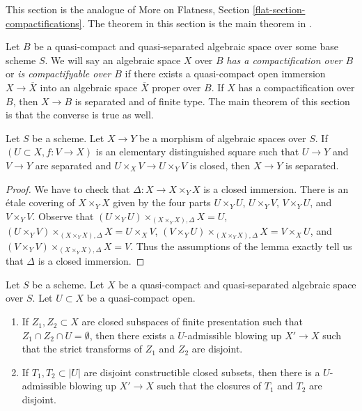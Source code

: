 \noindent
This section is the analogue of More on Flatness, Section
\ref{flat-section-compactifications}. The theorem in this
section is the main theorem in \cite{CLO}.

\medskip\noindent
Let $B$ be a quasi-compact and quasi-separated algebraic space over
some base scheme $S$. We will say an algebraic space $X$ over $B$
{\it has a compactification over $B$} or {\it is compactifyable over $B$}
if there exists a quasi-compact open immersion $X \to \overline{X}$
into an algebraic space $\overline{X}$ proper over $B$. If $X$
has a compactification over $B$, then $X \to B$ is separated and
of finite type. The main theorem of this section is that the converse
is true as well.

\begin{lemma}
\label{lemma-check-separated}
Let $S$ be a scheme. Let $X \to Y$ be a morphism of algebraic spaces over $S$.
If $(U \subset X, f : V \to X)$ is an elementary distinguished square
such that $U \to Y$ and $V \to Y$ are separated and
$U \times_X V \to U \times_Y V$ is closed, then $X \to Y$ is separated.
\end{lemma}

\begin{proof}
We have to check that $\Delta : X \to X \times_Y X$ is a closed immersion.
There is an \'etale covering of $X \times_Y X$ given by the four parts
$U \times_Y U$, $U \times_Y V$, $V \times_Y U$, and $V \times_Y V$.
Observe that
$(U \times_Y U) \times_{(X \times_Y X), \Delta} X  = U$,
$(U \times_Y V) \times_{(X \times_Y X), \Delta} X = U \times_X V$,
$(V \times_Y U) \times_{(X \times_Y X), \Delta} X = V \times_X U$, and
$(V \times_Y V) \times_{(X \times_Y X), \Delta} X = V$.
Thus the assumptions of the lemma
exactly tell us that $\Delta$ is a closed immersion.
\end{proof}

\begin{lemma}
\label{lemma-separate-disjoint-locally-closed-by-blowing-up}
Let $S$ be a scheme.
Let $X$ be a quasi-compact and quasi-separated algebraic space over $S$.
Let $U \subset X$ be a quasi-compact open.
\begin{enumerate}
\item If $Z_1, Z_2 \subset X$ are closed subspaces of finite
presentation such that $Z_1 \cap Z_2 \cap U = \emptyset$, then
there exists a $U$-admissible blowing up $X' \to X$
such that the strict transforms of $Z_1$ and $Z_2$ are disjoint.
\item If $T_1, T_2 \subset |U|$ are disjoint constructible closed
subsets, then there is a $U$-admissible blowing up $X' \to X$
such that the closures of $T_1$ and $T_2$ are disjoint.
\end{enumerate}
\end{lemma}

